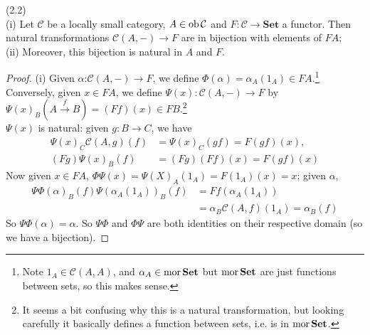 \documentclass[a4paper]{article}
\begin{document}
\begin{lemma} (2.2)\\
    (i) Let $\mathcal{C}$ be a locally small category, $A \in \operatorname{ob} \mathcal{C}$ and $F:\mathcal{C} \to \mathbf{Set}$ a functor. Then natural transformations $\mathcal{C}(A,-) \to F$ are in bijection with elements of $FA$;\\
    (ii) Moreover, this bijection is natural in $A$ and $F$.
    \begin{proof}
        (i) Given $\alpha$:$\mathcal{C}(A,-) \to F$, we define $\Phi(\alpha) = \alpha_A(1_A) \in FA$.\footnote{Note $1_A \in \mathcal{C}(A,A)$, and $\alpha_A \in \operatorname{mor} \mathbf{Set}$ but $\operatorname{mor} \mathbf{Set}$ are just functions between sets, so this makes sense.}\\
        Conversely, given $x \in FA$, we define $\Psi(x): \mathcal{C}(A,-) \to F$ by $\Psi(x)_B (A \xrightarrow{f} B) = (Ff)(x) \in FB$.\footnote{It seems a bit confusing why this is a natural transformation, but looking carefully it basically defines a function between sets, i.e. is in $\operatorname{mor} \mathbf{Set}$.}\\
        $\Psi(x)$ is natural: given $g:B \to C$, we have
        \begin{equation*}
            \begin{aligned}
                \Psi(x)_C \mathcal{C}(A,g) (f) &= \Psi(x)_C (gf) = F(gf)(x),\\
                (Fg) \Psi(x)_B(f) &= (Fg)(Ff)(x) = F(gf)(x)
            \end{aligned}
        \end{equation*}
        Now given $x \in FA$, $\Phi\Psi(x) = \Psi(X)_A (1_A) = F(1_A)(x) = x$; given $\alpha$,
        \begin{equation*}
            \begin{aligned}
                \Psi\Phi(\alpha)_B(f) \Psi(\alpha_A(1_A))_B(f) &= Ff(\alpha_A(1_A))\\
                &= \alpha_B\mathcal{C}(A,f)(1_A) = \alpha_B(f)
            \end{aligned}
        \end{equation*}
        So $\Psi\Phi(\alpha)=\alpha$. So $\Psi\Phi$ and $\Phi\Psi$ are both identities on their respective domain (so we have a bijection).
    \end{proof}
\end{lemma}
\end{document}
